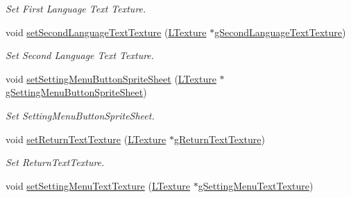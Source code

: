 \begin{DoxyCompactItemize}
\begin{DoxyCompactList}\small\item\em Set First Language Text Texture. \end{DoxyCompactList}\item 
\mbox{\label{class_setting_menu_a3038c7f09ac817cd9437f8ce95d68414}} 
void \mbox{\hyperlink{class_setting_menu_a3038c7f09ac817cd9437f8ce95d68414}{set\+Second\+Language\+Text\+Texture}} (\mbox{\hyperlink{class_l_texture}{L\+Texture}} $\ast$\mbox{\hyperlink{class_setting_menu_a19fd74870b4a6120dec613dd34cb8efa}{g\+Second\+Language\+Text\+Texture}})
\begin{DoxyCompactList}\small\item\em Set Second Language Text Texture. \end{DoxyCompactList}\item 
\mbox{\label{class_setting_menu_a34dc8e8aaef1f725c05bd42051e9753d}} 
void \mbox{\hyperlink{class_setting_menu_a34dc8e8aaef1f725c05bd42051e9753d}{set\+Setting\+Menu\+Button\+Sprite\+Sheet}} (\mbox{\hyperlink{class_l_texture}{L\+Texture}} $\ast$\mbox{\hyperlink{class_setting_menu_a739a40d912336a5939825c0ac34f1c00}{g\+Setting\+Menu\+Button\+Sprite\+Sheet}})
\begin{DoxyCompactList}\small\item\em Set Setting\+Menu\+Button\+Sprite\+Sheet. \end{DoxyCompactList}\item 
\mbox{\label{class_setting_menu_acee5cec0bf508fdf63b45bcfc75d0b40}} 
void \mbox{\hyperlink{class_setting_menu_acee5cec0bf508fdf63b45bcfc75d0b40}{set\+Return\+Text\+Texture}} (\mbox{\hyperlink{class_l_texture}{L\+Texture}} $\ast$\mbox{\hyperlink{class_setting_menu_a3a11c6b43a94fe2490b19e50fd0ae44e}{g\+Return\+Text\+Texture}})
\begin{DoxyCompactList}\small\item\em Set Return\+Text\+Texture. \end{DoxyCompactList}\item 
\mbox{\label{class_setting_menu_a0a366380e02acbb9558ed7197fc3ef3b}} 
void \mbox{\hyperlink{class_setting_menu_a0a366380e02acbb9558ed7197fc3ef3b}{set\+Setting\+Menu\+Text\+Texture}} (\mbox{\hyperlink{class_l_texture}{L\+Texture}} $\ast$\mbox{\hyperlink{class_setting_menu_aae85c23f501347d1bfa5570f150a93d6}{g\+Setting\+Menu\+Text\+Texture}})

\end{DoxyCompactItemize}
